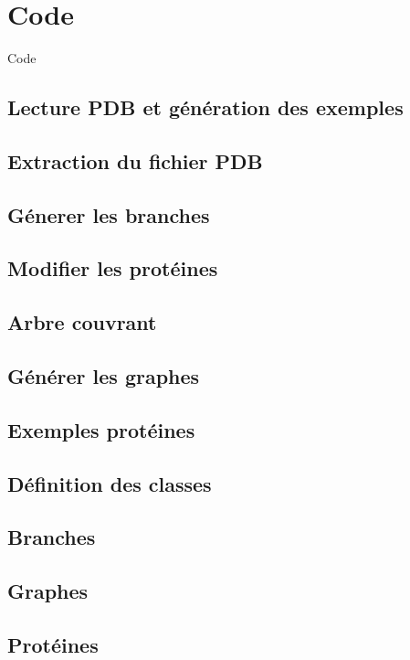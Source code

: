 \section{Code}
\begin{frame}[noframenumbering]{Code}
\begin{multicols}{2}
\tableofcontents
\end{multicols}
\end{frame}

\begin{frame}
    \section{Lecture PDB et génération des exemples}
    \subsection{Extraction du fichier PDB}
    
    \subsection{Génerer les branches}
    
    \subsection{Modifier les protéines}
    
    \subsection{Arbre couvrant}
    
    \subsection{Générer les graphes}
    
    \subsection{Exemples protéines}
    
\end{frame}
\begin{frame}
    \section{Définition des classes}  
    \subsection{Branches}
    
    \subsection{Graphes}
    
    \subsection{Protéines}
        
\end{frame}
